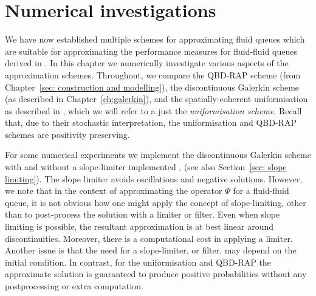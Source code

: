 \chapter{Numerical investigations\label{sec: numerics}}
We have now established multiple schemes for approximating fluid queues which are suitable for approximating the performance measures for fluid-fluid queues derived in \cite{bo2014}. In this chapter we numerically investigate various aspects of the approximation schemes. Throughout, we compare the QBD-RAP scheme (from Chapter~\ref{sec: construction and modelling}), the discontinuous Galerkin scheme (as described in Chapter~\ref{ch:galerkin}), and the spatially-coherent uniformisation as described in \cite{bo2013}, which we will refer to a just the \emph{uniformisation scheme}. %
Recall that, due to their stochastic interpretation, the uniformisation and QBD-RAP schemes are positivity preserving. 

For some numerical experiments we implement the discontinuous Galerkin scheme with and without a slope-limiter implemented \citep{c99}, \citep[Section~5.6.2]{nodalDGBook} (see also Section~\ref{sec: slope limiting}). The slope limiter avoids oscillations and negative solutions. However, we note that in the context of approximating the operator \(\mathbb\Psi\) for a fluid-fluid queue, it is not obvious how one might apply the concept of slope-limiting, other than to post-process the solution with a limiter or filter. Even when slope limiting is possible, the resultant approximation is at best linear around discontinuities. Moreover, there is a computational cost in applying a limiter. Another issue is that the need for a slope-limiter, or filter, may depend on the initial condition. In contrast, for the uniformisation and QBD-RAP the approximate solution is guaranteed to produce positive probabilities without any postprocessing or extra computation.

